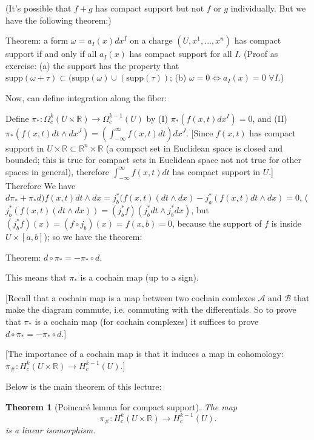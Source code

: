 \documentclass{article}
\theoremstyle{mystyle}
\newtheorem*{theorem*}{Theorem}
\theoremstyle{remark}
\numberwithin{equation}{section}
\begin{document}
(It's possible that $f+g$ has compact support but not $f$ or $g$ individually. But we have the following theorem:)

Theorem: a form $\omega =a_I(x) dx^I$ on a charge $(U,x^1,...,x^n)$ has compact support if and only if all $a_I(x)$ has compact support for all $I$. (Proof as exercise: (a) the support has the property that $\text{supp}(\omega+\tau) \subset (\text{supp}(\omega)\cup (\text{supp}(\tau))$; (b) $\omega=0\Leftrightarrow a_I(x)=0$ $\forall I$.)

Now, can define integration along the fiber:

Define $\pi_*\colon \Omega^k_c(U\times \mathbb{R})
\rightarrow \Omega^{k-1}_c(U)$ by (I) $\pi_*(f(x,t)dx^I)
=0$, and (II) $\pi_*(f(x,t)dt\wedge d x^J)
=\left(\int^{\infty}_{-\infty} f(x,t) dt\right)dx^J$. [Since $f(x,t)$ has compact support in $U\times \mathbb{R}\subset \mathbb{R}^n\times \mathbb{R}$ (a compact set in Euclidean space is closed and bounded; this is true for compact sets in Euclidean space not not true for other spaces in general), therefore $\int^{\infty}_{-\infty}f(x,t)dt $ has compact support in $U$.] Therefore We have $d\pi_*+\pi_*d)f(x,t)dt\wedge dx
=j_b^*(f(x,t)(dt\wedge dx)-j_a^*(f(x,t)dt\wedge dx)=0$, 
($j_b^*(f(x,t)(dt\wedge dx))= (j_b^*f)(j_b^*dt\wedge j_b^*dx)$, but $(j_b^*f)(x) = (f\circ j_b)(x) = f(x,b)=0$, because the support of $f$ is inside $U\times [a,b]$); so we have the theorem:

Theorem: $d\circ \pi_* = -\pi_*\circ d$.

This means that $\pi_*$ is a cochain map (up to a sign).

[Recall that a cochain map is a map between two cochain comlexes $\mathcal{A}$ and $\mathcal{B}$ that make the diagram commute, i.e. commuting with the differentials. So to prove that $\pi_*$ is a cochain map (for cochain complexes) it suffices to prove $d\circ \pi_* = -\pi_*\circ d$.]

[The importance of a cochain map is that it induces a map in cohomology: $\pi_\# \colon H^k_c(U\times \mathbb{R})\rightarrow H^{k-1}_c(U)$.]

Below is the main theorem of this lecture:

\begin{theorem*}[Poincar\'e lemma for compact support] 
The map
$$\pi_\# \colon H^k_c(U\times \mathbb{R})\rightarrow H^{k-1}_c(U).$$
is a linear isomorphism.
\end{theorem*}
\end{document}
